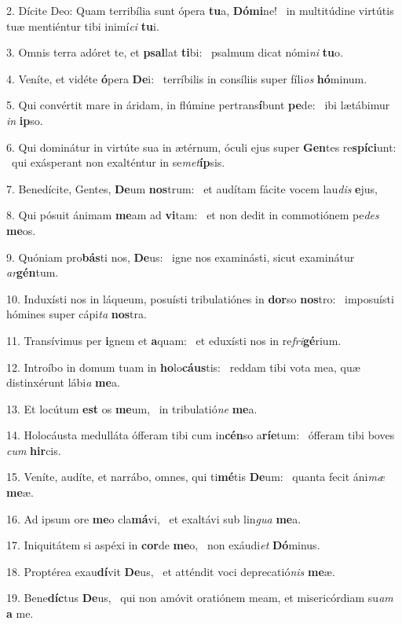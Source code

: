 2. Dícite Deo: Quam terribília sunt ópera \textbf{tu}a, \textbf{Dó}\textbf{mi}ne! \ast\  in multitúdine virtútis tuæ mentiéntur tibi inimí\textit{ci} \textbf{tu}i.\

3. Omnis terra adóret te, et \textbf{psal}lat \textbf{ti}bi: \ast\  psalmum dicat nómi\textit{ni} \textbf{tu}o.\

4. Veníte, et vidéte \textbf{ó}pera \textbf{De}i: \ast\  terríbilis in consíliis super fíli\textit{os} \textbf{hó}minum.\

5. Qui convértit mare in áridam, in flúmine pertrans\textbf{í}bunt \textbf{pe}de: \ast\  ibi lætábimur \textit{in} \textbf{ip}so.\

6. Qui dominátur in virtúte sua in ætérnum, óculi ejus super \textbf{Gen}tes re\textbf{spí}\textbf{ci}unt: \ast\  qui exásperant non exalténtur in se\textit{met}\textbf{íp}sis.\

7. Benedícite, Gentes, \textbf{De}um \textbf{nos}trum: \ast\  et audítam fácite vocem lau\textit{dis} \textbf{e}jus,\

8. Qui pósuit ánimam \textbf{me}am ad \textbf{vi}tam: \ast\  et non dedit in commotiónem pe\textit{des} \textbf{me}os.\

9. Quóniam pro\textbf{bás}ti nos, \textbf{De}us: \ast\  igne nos examinásti, sicut examinátur \textit{ar}\textbf{gén}tum.\

10. Induxísti nos in láqueum, posuísti tribulatiónes in \textbf{dor}so \textbf{nos}tro: \ast\  imposuísti hómines super cápi\textit{ta} \textbf{nos}tra.\

11. Transívimus per \textbf{i}gnem et \textbf{a}quam: \ast\  et eduxísti nos in re\textit{fri}\textbf{gé}rium.\

12. Introíbo in domum tuam in \textbf{ho}lo\textbf{cáus}tis: \ast\  reddam tibi vota mea, quæ distinxérunt lábi\textit{a} \textbf{me}a.\

13. Et locútum \textbf{est} os \textbf{me}um, \ast\  in tribulatió\textit{ne} \textbf{me}a.\

14. Holocáusta medulláta ófferam tibi cum in\textbf{cén}so a\textbf{rí}\textbf{e}tum: \ast\  ófferam tibi boves \textit{cum} \textbf{hir}cis.\

15. Veníte, audíte, et narrábo, omnes, qui ti\textbf{mé}tis \textbf{De}um: \ast\  quanta fecit áni\textit{mæ} \textbf{me}æ.\

16. Ad ipsum ore \textbf{me}o cla\textbf{má}vi, \ast\  et exaltávi sub lin\textit{gua} \textbf{me}a.\

17. Iniquitátem si aspéxi in \textbf{cor}de \textbf{me}o, \ast\  non exáudi\textit{et} \textbf{Dó}minus.\

18. Proptérea exau\textbf{dí}vit \textbf{De}us, \ast\  et atténdit voci deprecatió\textit{nis} \textbf{me}æ.\

19. Bene\textbf{díc}tus \textbf{De}us, \ast\  qui non amóvit oratiónem meam, et misericórdiam su\textit{am} \textbf{a} me.\

